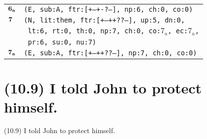 \documentclass{article}
\begin{document}
\begin{minipage}{\textwidth}
{\begin{tabular}{|r|l|}
    ${\textbf{\textrm{6}}_{\textbf{\textrm{a}}}}$ & \texttt{\texttt{(E,~sub:A,~ftr:[+--+-?---],~np:6,~ch:0,~co:0)}} \\
    ${\textbf{\textrm{7}}_{\phantom{z}}}$ & \texttt{\texttt{(N,~lit:them,~ftr:[+--++??--],~up:5,~dn:0,}} \\
    & \texttt{\texttt{~lt:6,~rt:0,~th:0,~np:7,~ch:0,~co:${\textrm{7}_{\textrm{a}}}$,~ec:${\textrm{7}_{\textrm{a}}}$,}} \\
    & \texttt{\texttt{~pr:6,~su:0,~nu:7)}} \\
    ${\textbf{\textrm{7}}_{\textbf{\textrm{a}}}}$ & \texttt{\texttt{(E,~sub:A,~ftr:[+--++??--],~np:7,~ch:0,~co:0)}} \\
    \hline
  \end{tabular}
  }
\end{minipage}
\bigbreak

\clearpage

%
%

\section*{(10.9) I told John to protect himself.}

\bigbreak
\begin{enumerate*}
\item[(10.9)] I told John to protect himself.
\end{enumerate*}
\bigbreak
\end{document}
